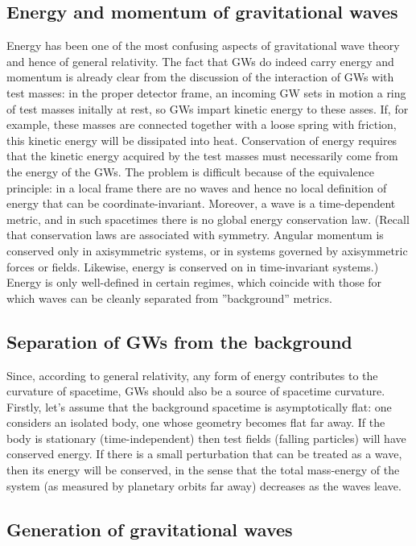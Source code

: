 \documentclass[binding=0.6cm, LaM]{sapthesis}
\begin{document}
\subsection{Energy and momentum of gravitational waves}

 Energy has been one of the most confusing aspects of gravitational wave theory and hence of general relativity.
The fact that GWs do indeed carry energy and momentum is already clear from the discussion of the interaction of GWs with test masses: 
in the proper detector frame, an incoming GW sets in motion a ring of test masses initally at rest, so GWs impart kinetic energy to these asses. 
If, for example, these masses are connected together with a loose spring with friction, this kinetic energy will be dissipated into heat. 
Conservation of energy requires that the kinetic energy acquired by the test masses must necessarily come from the energy of the GWs. 
The problem is difficult because of the equivalence principle: in a local frame there are no waves and hence no local definition of energy that can be coordinate-invariant. 
Moreover, a wave is a time-dependent metric, and in such spacetimes there is no global energy conservation law. (Recall that conservation laws are associated with symmetry. 
Angular momentum is conserved only in axisymmetric systems, or in systems governed by axisymmetric forces or fields. 
Likewise, energy is conserved on in time-invariant systems.) Energy is only well-defined in certain regimes, which coincide with those for which waves can be cleanly separated from ”background”
 metrics.

\subsection{Separation of GWs from the background}
Since, according to general relativity, any form of energy contributes to the curvature of spacetime, GWs should also be a source of spacetime curvature. 
Firstly, let's assume that the background spacetime is asymptotically flat: one considers an isolated body, one whose geometry becomes flat far away. 
If the body is stationary (time-independent) then test fields (falling particles) will have conserved energy. If there is a small perturbation that can be treated as a wave, 
then its energy will be conserved, in the sense that the total mass-energy of the system (as measured by planetary orbits far away) decreases as the waves leave.

\subsection{Generation of gravitational waves}
\end{document}
